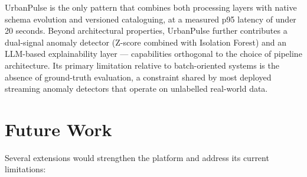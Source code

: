 \begin{table}[htbp]
\centering
\caption{Architectural comparison of UrbanPulse against reference pipeline patterns
         (\protect\cmark~yes, \protect\xmark~no).}
\label{tab:comparison}
\end{table}

\noindent UrbanPulse is the only pattern that combines both processing layers
with native schema evolution and versioned cataloguing, at a measured p95
latency of under 20 seconds. Beyond architectural properties, UrbanPulse
further contributes a dual-signal anomaly detector (Z-score combined with
Isolation Forest) and an LLM-based explainability layer --- capabilities
orthogonal to the choice of pipeline architecture. Its primary limitation
relative to batch-oriented systems is the absence of ground-truth evaluation,
a constraint shared by most deployed streaming anomaly detectors that operate
on unlabelled real-world data.

\section{Future Work}
\label{sec:future-work}

Several extensions would strengthen the platform and address its current
limitations:

